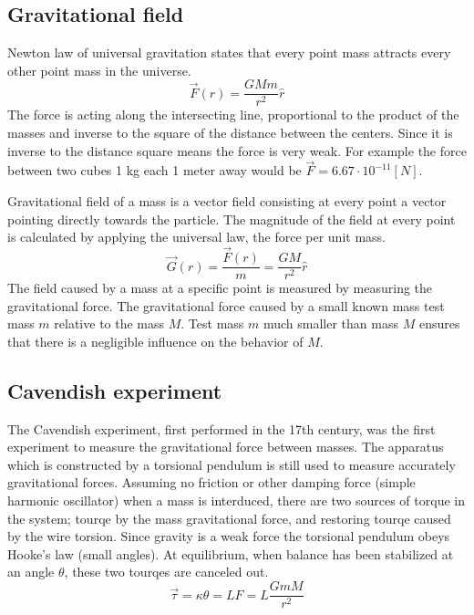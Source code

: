 \documentclass[\main/master.tex]{subfiles}
\begin{document}
\subsection{Gravitational field}
Newton law of universal gravitation states that every point mass attracts every other point mass in the universe.
\begin{equation}
\overrightarrow{F}(r) = \frac{GMm}{r^2}\hat{r}    \label{eqn:gravitation_force}
\end{equation} 
The force is acting along the intersecting line, proportional to the product of the masses and inverse to the square of the distance between the centers. Since it is inverse to the distance square means the force is very weak. For example the force between two cubes 1 kg each 1 meter away would be $\overrightarrow{F} = 6.67\cdot10^{-11} [N]$.
\par
Gravitational field of a mass is a vector field consisting at every point a vector pointing directly towards the particle. The magnitude of the field at every point is calculated by applying the universal law, the force per unit mass. 
\begin{equation}
\overrightarrow{G}(r) = \frac{\overrightarrow{F}(r)}{m} = \frac{GM}{r^2}\hat{r}    \label{eqn:gravitation_field}
\end{equation}
The field caused by a mass at a specific point is measured by measuring the gravitational force. The gravitational force caused by a small known mass test mass $m$ relative to the mass $M$. Test mass $m$ much smaller than mass $M$ ensures that there is a negligible influence on the behavior of $M$.  



\subsection{Cavendish experiment}
The Cavendish experiment, first performed in the 17th century, was the first experiment to measure the gravitational force between masses. The apparatus which is constructed by a torsional pendulum is still used to measure accurately gravitational forces. Assuming no friction or other damping force (simple harmonic oscillator) when a mass is interduced, there are two sources of torque in the system; tourqe by the mass gravitational force, and restoring tourqe caused by the wire torsion. Since gravity is a weak force the torsional pendulum obeys Hooke’s law (small angles). At equilibrium, when balance has been stabilized at an angle $\theta$, these two tourqes are canceled out.
\begin{equation}
\overrightarrow{\tau} = \kappa\theta = LF = L\frac{GmM}{r^2}    \label{eqn:gravitation_tourqe}
\end{equation}
\end{document}
